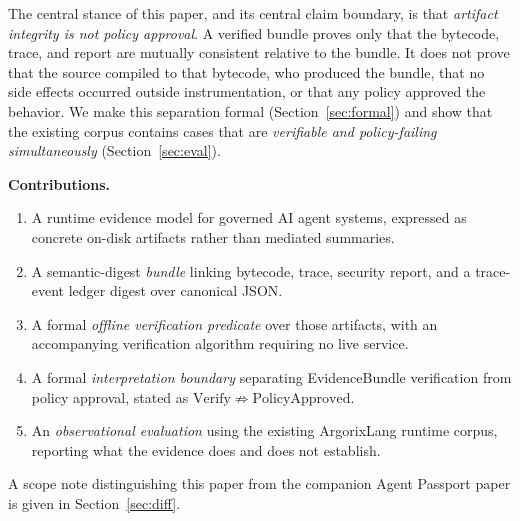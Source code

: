 \documentclass[conference]{IEEEtran}
\newcommand{\Argorix}{%
\textcolor{argViolet}{A}\textcolor{argViolet}{r}\textcolor{argIndigo}{g}\textcolor{argIndigo}{o}\textcolor{argElectric}{r}\textcolor{argElectric}{i}\textcolor{argElectric}{x}\textcolor{argCyan}{L}\textcolor{argCyan}{a}\textcolor{argCyanBright}{n}\textcolor{argCyanBright}{g}\xspace}
\begin{document}
The central stance of this paper, and its central claim boundary, is that
\emph{artifact integrity is not policy approval}. A verified bundle proves only that the
bytecode, trace, and report are mutually consistent relative to the bundle. It does not
prove that the source compiled to that bytecode, who produced the bundle, that no side
effects occurred outside instrumentation, or that any policy approved the behavior. We
make this separation formal (Section~\ref{sec:formal}) and show that the existing corpus
contains cases that are \emph{verifiable and policy-failing simultaneously}
(Section~\ref{sec:eval}).

\noindent\textbf{Contributions.}
\begin{enumerate}
\item A runtime evidence model for governed AI agent systems, expressed as concrete
on-disk artifacts rather than mediated summaries.
\item A semantic-digest \emph{bundle} linking bytecode, trace, security report, and a
trace-event ledger digest over canonical JSON.
\item A formal \emph{offline verification predicate} over those artifacts, with an
accompanying verification algorithm requiring no live service.
\item A formal \emph{interpretation boundary} separating EvidenceBundle verification from
policy approval, stated as $\mathrm{Verify}\nRightarrow\mathrm{PolicyApproved}$.
\item An \emph{observational evaluation} using the existing \Argorix runtime corpus,
reporting what the evidence does and does not establish.
\end{enumerate}

A scope note distinguishing this paper from the companion Agent Passport paper is given
in Section~\ref{sec:diff}.
\end{document}
